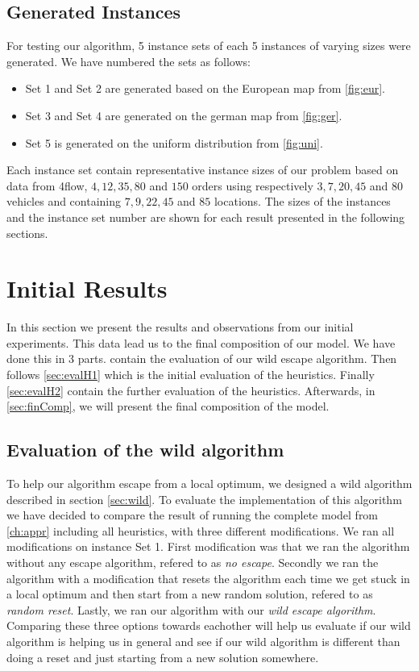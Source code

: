 \documentclass[../main.tex]{subfiles}
\begin{document}
\subsection{Generated Instances}
\label{sec:geni}
For testing our algorithm, 5 instance sets of each 5 instances of varying sizes were generated. 
We have numbered the sets as follows:
\begin{itemize}
    \item Set 1 and Set 2 are generated based on the European map from \cref{fig:eur}.
    \item Set 3 and Set 4 are generated on the german map from \cref{fig:ger}.
    \item Set 5 is generated on the uniform distribution from \cref{fig:uni}.
\end{itemize}

Each instance set contain representative instance sizes of our problem based on data from 4flow, $4, 12, 35, 80$ and $150$ orders using respectively $3, 7, 20, 45$ and $80$ vehicles and containing $7, 9, 22, 45$ and $85$ locations.  
The sizes of the instances and the instance set number are shown for each result presented in the following sections.

\section{Initial Results}
\label{sec:iniRes}
In this section we present the results and observations from our initial experiments. 
This data lead us to the final composition of our model.
We have done this in 3 parts.  contain the evaluation of our wild escape algorithm. Then follows \cref{sec:evalH1} which is the initial evaluation of the heuristics. Finally \cref{sec:evalH2} contain the further evaluation of the heuristics.
Afterwards, in \cref{sec:finComp}, we will present the final composition of the model.

\subsection{Evaluation of the wild algorithm}
\label{sec:evalW}
To help our algorithm escape from a local optimum, we designed a wild algorithm described in section \cref{sec:wild}. 
To evaluate the implementation of this algorithm we have decided to compare the result of running the complete model from \cref{ch:appr} including all heuristics, with three different modifications.
We ran all modifications on instance Set 1.
First modification was that we ran the algorithm without any escape algorithm, refered to as \emph{no escape}.
Secondly we ran the algorithm with a modification that resets the algorithm each time we get stuck in a local optimum and then start from a new random solution, refered to as \emph{random reset}.
Lastly, we ran our algorithm with our \emph{wild escape algorithm}.
Comparing these three options towards eachother will help us evaluate if our wild algorithm is helping us in general and see if our wild algorithm is different than doing a reset and just starting from a new solution somewhere.
\end{document}
